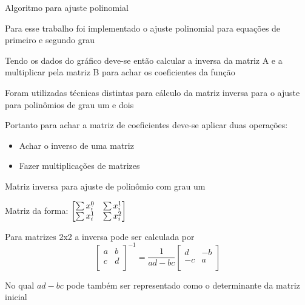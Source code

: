 \documentclass[10pt]{beamer}
\begin{document}
\begin{frame}[fragile]{Algoritmo para ajuste polinomial}
  
  Para esse trabalho foi implementado o ajuste polinomial para equações de primeiro e segundo grau

  Tendo os dados do gráfico deve-se então calcular a inversa da matriz A e a multiplicar pela matriz B para achar os coeficientes da função

  Foram utilizadas técnicas distintas para cálculo da matriz inversa para o ajuste para polinômios de grau um e dois  

  Portanto para achar a matriz de coeficientes deve-se aplicar duas operações:
  \begin{itemize}
    \item Achar o inverso de uma matriz
    \item Fazer multiplicações de matrizes
  \end{itemize}


\end{frame}


\begin{frame}[fragile]{Matriz inversa para ajuste de polinômio com grau um}
  
  Matriz da forma:                                   
  $\begin{bmatrix}
    \sum{x_{i}^{0}} & \sum{x_{i}^{1}} \\
    \sum{x_{i}^{1}} & \sum{x_{i}^{2}} \\
  \end{bmatrix} \newline $
  


  Para matrizes 2x2 a inversa pode ser calculada por
  \[
  \begin{bmatrix}
    {a} & {b} \\
    {c} & {d} \\
  \end{bmatrix}^{-1}
  = 
  \dfrac{1}{ad-bc}
  \begin{bmatrix}
    {d} & {-b} \\
    {-c} & {a} \\
  \end{bmatrix}
  \]

  No qual $ad-bc$ pode também ser representado como o determinante da matriz inicial

\end{frame}
\end{document}
